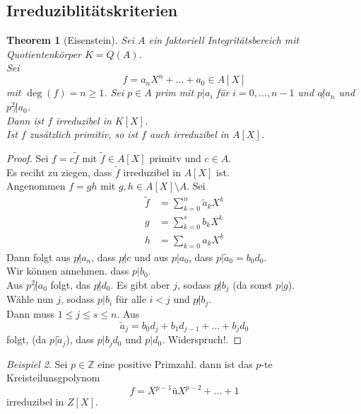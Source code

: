 \documentclass[10pt,a4paper]{article}
\newcommand{\Z}{\ensuremath{\mathbb{Z}}}
\theoremstyle{plain}
\newtheorem{theorem}{Theorem}[section]
\theoremstyle{definition}
\theoremstyle{remark}
\newtheorem{exm}[theorem]{Beispiel}
\begin{document}
	\subsection{Irreduziblitätskriterien}
	\begin{theorem}[Eisenstein]
		Sei $A$ ein faktoriell Integritätsbereich mit Quotientenkörper $K=Q(A)$.\\
		Sei
		\[f=a_nX^n+...+a_0\in A[X]\]
		mit $\deg(f)=n\geq 1$. Sei $p\in A$ prim mit $p|a_i$ für $i=0,...,n-1$ und $a\not|a_n$ und $p^2\not |a_0$.\\
		Dann ist $f$ irreduzibel in $K[X]$.\\
		Ist $f$ zusätzlich primitiv, so ist $f$ auch irreduzibel in $A[X]$.
	\end{theorem}
	\begin{proof}
		Sei $f=c\tilde f$ mit $\tilde f\in A[X]$ primitv und $c\in A$.\\
		Es reciht zu ziegen, dass $\tilde f$ irreduzibel in $A[X]$ ist.\\
		Angenommen $f=gh$ mit $g,h\in A[X]\setminus A$. Sei
		\begin{align*}
		\tilde f&=\sum_{k=0}^{n}\tilde a_kX^k\\
		g&=\sum_{k=0}^{s}b_kX^k\\
		h&=\sum_{k=0} a_kX^k
		\end{align*}
		Dann folgt aus $p\not|a_n$, dass $p\not|c$ und aus $p|a_0$, dass $p|\tilde a_0=b_0d_0$.\\
		Wir können annehmen. dass $p|b_0$.\\
		Aus $p^2\not |a_0$ folgt, das $p\not| d_0$. Es gibt aber $j$, sodass $p\not|b_j$ (da sonst $p|g$).\\
		Wähle nun $j$, sodass $p|b_i$ für alle $i<j$ und $p\not| b_j$.\\
		Dann muss $1\leq j\leq s\leq n$. Aus 
		\[\tilde a_j=b_0d_j+b_1d_{j-1}+...+b_jd_0\]
		folgt, (da $p|\tilde a_j$), dass $p|b_jd_0$ und $p|d_0$. Widerspruch!.
	\end{proof}

	\begin{exm}
		Sei $p\in\Z$ eine positive Primzahl. dann ist das $p$-te Kreisteilunsgpolynom
		\[f=X^{p-1}üX^{p-2}+...+1\]
		irreduzibel in $Z[X]$.
	\end{exm}
\end{document}
